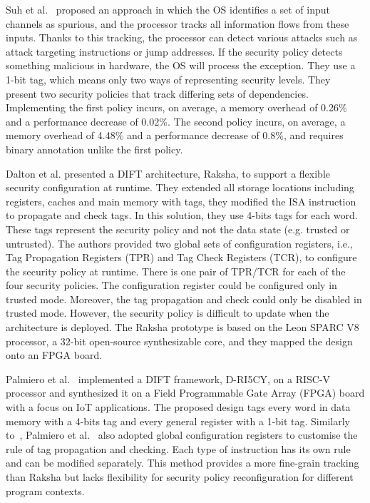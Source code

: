 Suh et al.~\cite{SLD-04-sigplan} proposed an approach in which the OS identifies a set of input channels as spurious, and the processor tracks all information flows from these inputs. Thanks to this tracking, the processor can detect various attacks such as attack targeting instructions or jump addresses. If the security policy detects something malicious in hardware, the OS will process the exception. They use a 1-bit tag, which means only two ways of representing security levels. They present two security policies that track differing sets of dependencies. Implementing the first policy incurs, on average, a memory overhead of 0.26\% and a performance decrease of 0.02\%. The second policy incurs, on average, a memory overhead of 4.48\% and a performance decrease of 0.8\%, and requires binary annotation unlike the first policy.

Dalton et al.\cite{DKK-07-sigarch} presented a DIFT architecture, Raksha, to support a flexible security configuration at runtime. They extended all storage locations including registers, caches and main memory with tags, they modified the ISA instruction to propagate and check tags. In this solution, they use 4-bits tags for each word. These tags represent the security policy and not the data state (e.g. trusted or untrusted). The authors provided two global sets of configuration registers, i.e., Tag Propagation Registers (TPR) and Tag Check Registers (TCR), to configure the security policy at runtime. There is one pair of TPR/TCR for each of the four security policies. The configuration register could be configured only in trusted mode. Moreover, the tag propagation and check could only be disabled in trusted mode. However, the security policy is difficult to update when the architecture is deployed.
The Raksha prototype is based on the Leon SPARC V8 processor, a 32-bit open-source synthesizable core, and they mapped the design onto an FPGA board.

Palmiero et al.~\cite{PDGLC-18-hpec} implemented a DIFT framework, D-RI5CY, on a RISC-V processor and synthesized it on a Field Programmable Gate Array (FPGA) board with a focus on IoT applications. The proposed design tags every word in data memory with a 4-bits tag and every general register with a 1-bit tag. Similarly to~\cite{DKK-07-sigarch}, Palmiero et al.~\cite{PDGLC-18-hpec} also adopted global configuration registers to customise the rule of tag propagation and checking. Each type of instruction has its own rule and can be modified separately. This method provides a more fine-grain tracking than Raksha but lacks flexibility for security policy reconfiguration for different program contexts.

